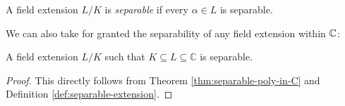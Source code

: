 \begin{definition} \label{def:separable-extension}
    A field extension $L / K$ is \textit{separable} if every $\alpha \in L$ is separable.
\end{definition}

We can also take for granted the separability of any field extension within $\mathbb C$:

\begin{theorem} \label{thm:separable-extension-in-C}
    A field extension $L/K$ such that $K \subseteq L \subseteq \mathbb C$ is separable. 
\end{theorem}

\begin{proof}
    This directly follows from Theorem \ref{thm:separable-poly-in-C} and Definition \ref{def:separable-extension}. 
\end{proof}
